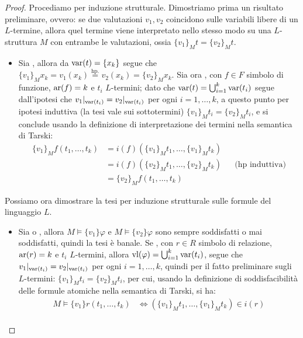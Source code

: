 \begin{proof}
    Procediamo per induzione strutturale. Dimostriamo prima un risultato preliminare, ovvero: se due valutazioni $v_1,v_2$ coincidono sulle variabili libere di un $L$-termine, allora quel termine viene interpretato nello stesso modo su una $L$-struttura $M$ con entrambe le valutazioni, ossia $\{v_1\}_M t = \{v_2\}_M t$.
    \begin{itemize}
        \item [$\boxed{\text{$L$-termini}}$] Sia , allora da $\operatorname{var}(t) = \{x_k\}$ segue che $\{v_1\}_M x_k = v_1(x_k) \overset{\text{hp.}}{=} v_2(x_k) = \{v_2\}_M x_k$. Sia ora , con $f \in F$ simbolo di funzione, $\operatorname{ar}(f) = k$ e $t_i$ $L$-termini;
        dato che $\operatorname{var}(t) = \bigcup_{i = 1}^k \operatorname{var}(t_i)$ segue dall'ipotesi che $v_1|_{\operatorname{var}(t_i)} = v_2|_{\operatorname{var}(t_i)}$ per ogni $i = 1,\ldots,k$, a questo punto per ipotesi induttiva (la tesi vale sui sottotermini) $\{v_1\}_M t_i = \{v_2\}_M t_i$, e si conclude usando la definizione di interpretazione dei termini nella semantica di Tarski:
        \begin{align*}
            \{v_1\}_M f(t_1,\ldots,t_k) &= i(f)(\{v_1\}_M t_1,\ldots,\{v_1\}_M t_k) \\
            &= i(f)(\{v_2\}_M t_1,\ldots,\{v_2\}_M t_k) &&\text{(hp induttiva)}\\
            &= \{v_2\}_M f(t_1,\ldots,t_k)
    \end{align*}
    \end{itemize}
    Possiamo ora dimostrare la tesi per induzione strutturale sulle formule del linguaggio $L$.
    \begin{itemize}
        \item [$\boxed{\text{$L$-formule atomiche}}$] Sia \purple{$\varphi = \top$} o \purple{$\varphi = \bot$}, allora $M \models \{v_1\} \varphi$ e $M \models \{v_2\} \varphi$ sono sempre soddisfatti o mai soddisfatti, quindi la tesi è banale.
            Se , con $r \in R$ simbolo di relazione, $\operatorname{ar}(r) = k$ e $t_i$ $L$-termini, allora $\operatorname{vl}(\varphi) = \bigcup_{i = 1}^k \operatorname{var}(t_i)$, segue che $v_1|_{\operatorname{var}(t_i)} = v_2|_{\operatorname{var}(t_i)}$ per ogni $i = 1,\ldots,k$, quindi per il fatto preliminare sugli $L$-termini: $\{v_1\}_M t_i = \{v_2\}_M t_i$,
            per cui, usando la definizione di soddisfacibilità delle formule atomiche nella semantica di Tarski, si ha:
            \begin{align*}
                M \models \{v_1\} r(t_1,\ldots,t_k) &\iff (\{v_1\}_M t_1,\ldots,\{v_1\}_M t_k) \in i(r) \\

\end{align*}
\end{itemize}
\end{proof}
